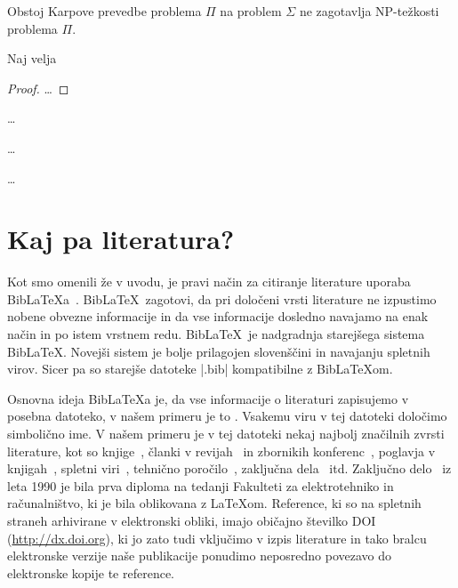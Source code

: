\documentclass[9pt]{style/friteza}
\begin{document}
\begin{remark}
Obstoj Karpove prevedbe problema $\Pi$ na problem $\Sigma$ ne zagotavlja NP-težkosti problema $\Pi$.
\end{remark}

\begin{theorem}
Naj velja
\end{theorem}

\begin{proof}
\dots
\end{proof}

\begin{corollary}
\dots
\end{corollary}

\begin{lemma}
\dots
\end{lemma}

\begin{example}
\dots
\end{example}


\section{Kaj pa literatura?}
\label{sec:lit}

Kot smo omenili že v uvodu, je pravi način za citiranje literature uporaba Bib\LaTeX{a}~\cite{biblatex}.
Bib\LaTeX\ zagotovi, da pri določeni vrsti literature ne izpustimo
nobene obvezne informacije
in da vse informacije dosledno navajamo na enak način in po istem vrstnem redu.
Bib\LaTeX\ je nadgradnja starejšega sistema Bib\LaTeX. Novejši sistem je bolje prilagojen slovenščini in navajanju spletnih virov. Sicer pa so starejše datoteke \ltx|.bib| kompatibilne z Bib\LaTeX om.

Osnovna ideja Bib\LaTeX{a} je, da vse informacije o literaturi zapisujemo v posebna datoteko, v našem primeru je to .
Vsakemu viru v tej datoteki določimo simbolično ime.
V  našem primeru je v tej datoteki nekaj najbolj značilnih zvrsti literature, kot so knjige~\cite{lamport},
članki v revijah~\cite{leonardo} in zbornikih konferenc~\cite{ciuha2010visualization},
poglavja v knjigah~\cite{poglavje_springer},
spletni viri~\cite{slovarji,video},
tehnično poročilo~\cite{andersen2012kinect},
zaključna dela~\cite{diploma} itd.
Zaključno delo~\cite{diploma} iz leta 1990 je bila prva diploma na tedanji Fakulteti za elektrotehniko in računalništvo, ki je bila oblikovana z \LaTeX om.
Reference, ki so na spletnih straneh arhivirane v elektronski obliki, imajo običajno  \v stevilko DOI (\url{http://dx.doi.org}), ki jo zato tudi vključimo v izpis literature in tako bralcu elektronske verzije naše publikacije ponudimo neposredno povezavo do elektronske kopije te reference.
\end{document}
